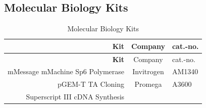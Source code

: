 \documentclass[11pt,singlespacinge,twoside]{reedthesis} %
\begin{document}
\hypertarget{mat-mobikits}{%
\subsection{Molecular Biology Kits}\label{mat-mobikits}}
\begin{longtable}[]{@{}rcl@{}}
\caption{\label{tab:mat-mobikits} Molecular Biology Kits}\tabularnewline
\toprule
\begin{minipage}[b]{0.50\columnwidth}\raggedleft
\textbf{Kit}\strut
\end{minipage} & \begin{minipage}[b]{0.26\columnwidth}\centering
Company\strut
\end{minipage} & \begin{minipage}[b]{0.16\columnwidth}\raggedright
cat.-no.\strut
\end{minipage}\tabularnewline
\midrule
\endfirsthead
\toprule
\begin{minipage}[b]{0.50\columnwidth}\raggedleft
\textbf{Kit}\strut
\end{minipage} & \begin{minipage}[b]{0.26\columnwidth}\centering
Company\strut
\end{minipage} & \begin{minipage}[b]{0.16\columnwidth}\raggedright
cat.-no.\strut
\end{minipage}\tabularnewline
\midrule
\endhead
\begin{minipage}[t]{0.50\columnwidth}\raggedleft
mMessage mMachine Sp6 Polymerase\strut
\end{minipage} & \begin{minipage}[t]{0.26\columnwidth}\centering
Invitrogen\strut
\end{minipage} & \begin{minipage}[t]{0.16\columnwidth}\raggedright
AM1340\strut
\end{minipage}\tabularnewline
\begin{minipage}[t]{0.50\columnwidth}\raggedleft
pGEM-T TA Cloning\strut
\end{minipage} & \begin{minipage}[t]{0.26\columnwidth}\centering
Promega\strut
\end{minipage} & \begin{minipage}[t]{0.16\columnwidth}\raggedright
A3600\strut
\end{minipage}\tabularnewline
\begin{minipage}[t]{0.50\columnwidth}\raggedleft
Superscript III cDNA Synthesis\strut
\end{minipage} & \begin{minipage}[t]{0.26\columnwidth}\centering

\end{minipage}
\end{longtable}
\end{document}
